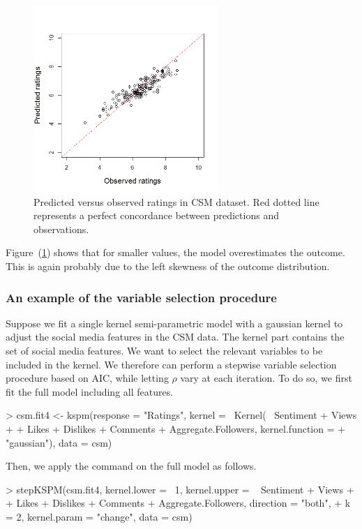 \begin{figure}[htbp]
\centering
\includegraphics[width = 7cm]{figure3}
\caption{\label{fig:csm_Figure3} Predicted versus observed ratings in CSM dataset. Red dotted line represents a perfect concordance between predictions and observations.}
\end{figure}

Figure~(\ref{fig:csm_Figure3}) shows that for smaller values, the model overestimates the outcome. This is again probably due to the left skewness of the outcome distribution.

\subsubsection{An example of the variable selection procedure} \label{sec:illustrations-csm-model3}

Suppose we fit a single kernel semi-parametric model with a gaussian kernel to adjust the social media features in the CSM data. The kernel part contains the set of social media features. We want to select the relevant variables to be included in the kernel. We therefore can perform a stepwise variable selection procedure based on AIC, while letting $\rho$ vary at each iteration. To do so, we first fit the full model including all features.


\begin{example}
> csm.fit4 <- kspm(response = "Ratings", kernel = ~Kernel(~ Sentiment + Views  
+    + Likes + Dislikes + Comments + Aggregate.Followers, kernel.function = 
+    "gaussian"), data = csm)
\end{example}


Then, we apply the  command on the full model as follows.


\begin{example}
> stepKSPM(csm.fit4, kernel.lower = ~1, kernel.upper = ~ Sentiment + Views 
+    + Likes + Dislikes + Comments + Aggregate.Followers, direction = "both", 
+    k = 2, kernel.param = "change", data = csm)
\end{example}


